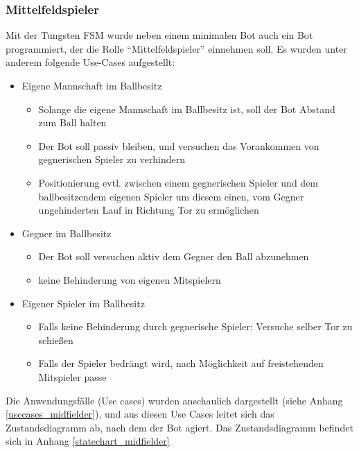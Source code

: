 \documentclass[fontsize=12pt,a4paper,final]{scrartcl}[2003/01/01]
\begin{document}
\subsubsection{Mittelfeldspieler}
Mit der Tungsten FSM wurde neben einem minimalen Bot auch ein Bot programmiert, der die Rolle ``Mittelfeldspieler'' einnehmen soll. Es wurden unter anderem folgende Use-Cases aufgestellt:

\begin{itemize}
 \item Eigene Mannschaft im Ballbesitz
 \begin{itemize}
  \item Solange die eigene Mannschaft im Ballbesitz ist, soll der Bot Abstand zum Ball halten
  \item Der Bot soll passiv bleiben, und versuchen das Vorankommen von gegnerischen Spieler zu verhindern
  \item Positionierung evtl. zwischen einem gegnerischen Spieler und dem ballbesitzendem eigenen Spieler um diesem einen, vom Gegner ungehinderten Lauf in Richtung Tor zu ermöglichen
 \end{itemize}
 
 \item Gegner im Ballbesitz
 \begin{itemize}
  \item Der Bot soll versuchen aktiv dem Gegner den Ball abzunehmen
  \item keine Behinderung von eigenen Mitspielern
 \end{itemize}
 
 \item Eigener Spieler im Ballbesitz
 \begin{itemize}
  \item Falls keine Behinderung durch gegnerische Spieler: Versuche selber Tor zu schießen
  \item Falls der Spieler bedrängt wird, nach Möglichkeit auf freistehenden Mitspieler passe
 \end{itemize}
\end{itemize}
Die Anwendungsfälle (Use cases) wurden anschaulich dargestellt (siehe Anhang \ref{usecases_midfielder}), und aus diesen Use Cases leitet sich das Zustandsdiagramm ab, nach dem der Bot agiert. Das Zustandsdiagramm befindet sich in Anhang \ref{statechart_midfielder}
\end{document}
